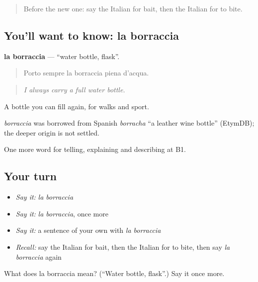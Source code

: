 \label{lesson:IT-C501-borraccia}



\begin{quote}
Before the new one: say the Italian for bait, then the Italian for to bite.
\end{quote}

\subsection*{You'll want to know: la borraccia}
\textbf{la borraccia} — \textquotedblleft{}water bottle, flask\textquotedblright{}.

\begin{quote}
Porto sempre la borraccia piena d'acqua.
\end{quote}

\begin{quote}
\emph{I always carry a full water bottle.}
\end{quote}

A bottle you can fill again, for walks and sport.

\begin{cousinweb}
\emph{borraccia} was borrowed from Spanish \emph{borracha} \textquotedblleft{}a leather wine bottle\textquotedblright{} (EtymDB); the deeper origin is not settled.
\end{cousinweb}

\begin{grammarlens}[title={What you've built}]
One more word for telling, explaining and describing at B1.
\end{grammarlens}

\subsection*{Your turn}
\begin{itemize}
\raggedright
  \item \emph{Say it:} \emph{la borraccia}
  \item \emph{Say it:} \emph{la borraccia}, once more
  \item \emph{Say it:} a sentence of your own with \emph{la borraccia}
  \item \emph{Recall:} say the Italian for bait, then the Italian for to bite, then say \emph{la borraccia} again
\end{itemize}

\begin{tcolorbox}[breakable,colback=teal!4,colframe=teal!35!black,title={Before you move on}]
What does la borraccia mean? (\textquotedblleft{}Water bottle, flask\textquotedblright{}.) Say it once more.
\end{tcolorbox}
